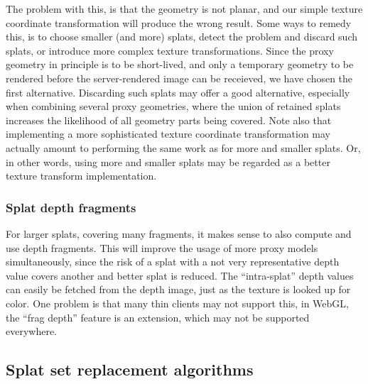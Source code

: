 The problem with this, is that the geometry is not planar, and our simple texture
coordinate transformation will produce the wrong result. Some ways to remedy
this, is to choose smaller (and more) splats, detect the problem and discard
such splats, or introduce more complex texture transformations. Since the proxy
geometry in principle is to be short-lived, and only a temporary geometry to be
rendered before the server-rendered image can be receieved, we have chosen the
first alternative. Discarding such splats may offer a good alternative,
especially when combining several proxy geometries, where the union of retained
splats increases the likelihood of all geometry parts being covered. Note also
that implementing a more sophisticated texture coordinate transformation may
actually amount to performing the same work as for more and smaller splats. Or,
in other words, using more and smaller splats may be regarded as a better
texture transform implementation.


\subsubsection{Splat depth fragments}

For larger splats, covering many fragments, it makes sense to also compute and
use depth fragments. This will improve the usage of more proxy models
simultaneously, since the risk of a splat with a not very representative depth
value covers another and better splat is reduced. The ``intra-splat'' depth
values can easily be fetched from the depth image, just as the texture is looked
up for color. One problem is that many thin clients may not support this, in
WebGL, the ``frag depth'' feature is an extension, which may not be supported
everywhere.


\subsection{Splat set replacement algorithms}
\label{sec:proxyModelReplacement}

